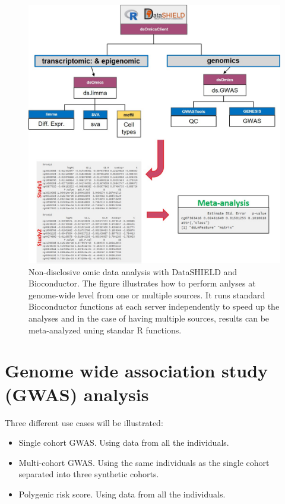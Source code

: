 \documentclass[
]{book}
\providecommand{\tightlist}{%
  \setlength{\itemsep}{0pt}\setlength{\parskip}{0pt}}
\begin{document}
\begin{figure}

{\centering \includegraphics[width=14.62in]{fig/dsOmics_C} 

}

\caption{Non-disclosive omic data analysis with DataSHIELD and Bioconductor. The figure illustrates how to perform anlyses at genome-wide level from one or multiple sources. It runs standard Bioconductor functions at each server independently to speed up the analyses and in the case of having multiple sources, results can be meta-analyzed uning standar R functions.}\label{fig:omicAnal2}
\end{figure}

\hypertarget{genome-wide-association-study-gwas-analysis}{%
\chapter{Genome wide association study (GWAS) analysis}\label{genome-wide-association-study-gwas-analysis}}

Three different use cases will be illustrated:

\begin{itemize}
\tightlist
\item
  Single cohort GWAS. Using data from all the individuals.
\item
  Multi-cohort GWAS. Using the same individuals as the single cohort separated into three synthetic cohorts.
\item
  Polygenic risk score. Using data from all the individuals.
\end{itemize}
\end{document}
